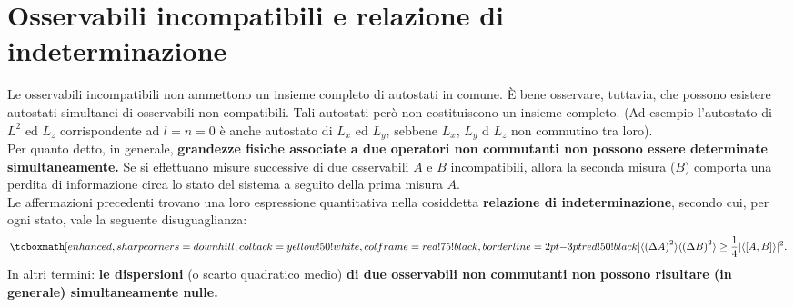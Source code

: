 \section[Osservabili incompatibili e relazione di indeterminazione]{Osservabili incompatibili e relazione di\\ indeterminazione}
Le osservabili incompatibili non ammettono un insieme completo di autostati in comune. È bene osservare, tuttavia, che possono esistere autostati simultanei di osservabili non compatibili. Tali autostati però non costituiscono un insieme completo. (Ad esempio l'autostato di $L^2$ ed $L_z$ corrispondente ad $l=n=0$ è anche autostato di $L_x$ ed $L_y$, sebbene $L_x$, $L_y$ d $L_z$ non commutino tra loro).\\

Per quanto detto, in generale, \textbf{grandezze fisiche associate a due operatori non commutanti non possono essere determinate simultaneamente.} Se si effettuano misure successive di due osservabili $A$ e $B$ incompatibili, allora la seconda misura ($B$) comporta una perdita di informazione circa lo stato del sistema a seguito della prima misura $A$.\\

Le affermazioni precedenti trovano una loro espressione quantitativa nella cosiddetta \textbf{relazione di indeterminazione}, secondo cui, per ogni stato, vale la seguente disuguaglianza:
	\begin{equation}
		\label{eq:cap4_2}
		\tcboxmath[enhanced,sharp corners=downhill ,colback=yellow!50!white,colframe=red!75!black, borderline={2pt}{-3pt}{red!50!black}]{
			\langle \left( \Delta A \right) ^2 \rangle \langle \left( \Delta B \right) ^2 \rangle \geq\frac{1}{4}\vert \langle \left[A,B \right] \rangle \vert ^2.
			}
	\end{equation}
In altri termini: \textbf{le dispersioni} (o scarto quadratico medio) \textbf{di due osservabili non commutanti non possono risultare (in generale) simultaneamente nulle.}\\


